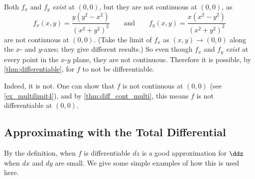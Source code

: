 Both $f_x$ and $f_y$ \textit{exist} at $(0,0)$, but they are not continuous at $(0,0)$, as 
$$f_x(x,y) = \frac{y(y^2-x^2)}{(x^2+y^2)^2} \qquad \text{and}\qquad f_y(x,y) = \frac{x(x^2-y^2)}{(x^2+y^2)^2} $$ are not continuous at $(0,0)$. (Take the limit of $f_x$ as $(x,y)\to(0,0)$ along the $x$- and $y$-axes; they give different results.) So even though $f_x$ and $f_y$ \textit{exist} at every point in the $x$-$y$ plane, they are not continuous. Therefore it is possible, by \autoref{thm:differentiable}, for $f$ to not be differentiable.

 Indeed, it is not. One can show that $f$ is not continuous at $(0,0)$ (see \autoref{ex_multilimit4}), and by \autoref{thm:diff_cont_multi}, this means $f$ is not differentiable at $(0,0)$.

\subsection*{Approximating with the Total Differential}

By the definition, when $f$ is differentiable $dz$ is a good approximation for $\ddz$ when $dx$ and $dy$ are small. We give some simple examples of how this is used here.

